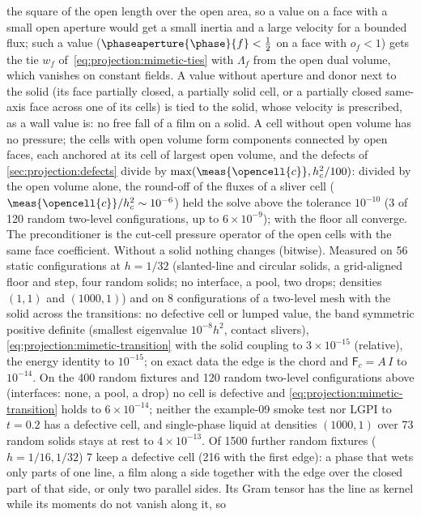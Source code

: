 the square of the open length over the open area, so a value on a face with a
small open aperture would get a small inertia and a large velocity for a
bounded flux; such a value ($\phaseaperture{\phase}{f}<\frac12$ on a face with
$o_f<1$) gets the tie $w_f$ of~\cref{eq:projection:mimetic-ties} with
$\Lambda_f$ from the open dual volume, which vanishes on constant fields. A value without aperture and donor
next to the solid (its face partially closed, a partially solid cell, or a
partially closed same-axis face across one of its cells) is tied to the
solid, whose velocity is prescribed, as a wall value is: no free fall of a
film on a solid. A cell without open volume has no pressure; the cells with
open volume form components connected by open faces, each anchored at its
cell of largest open volume, and the defects of
\cref{sec:projection:defects} divide by $\max(\meas{\opencell{c}},h_c^2/100)$:
divided by the open volume alone, the round-off of the fluxes of a sliver
cell ($\meas{\opencell{c}}/h_c^2\sim10^{-6}$) held the solve above the
tolerance $10^{-10}$ (3 of 120 random two-level configurations, up to
$6\times10^{-9}$); with the floor all converge. The
preconditioner is the cut-cell pressure operator of the open cells with the
same face coefficient. Without a solid nothing changes (bitwise).
Measured on 56 static configurations at $h=1/32$ (slanted-line and circular
solids, a grid-aligned floor and step, four random solids; no interface, a
pool, two drops; densities $(1,1)$ and $(1000,1)$) and on 8 configurations
of a two-level mesh with the solid across the transitions: no defective cell
or lumped value, the band symmetric positive definite (smallest eigenvalue
$10^{-8}h^2$, contact slivers), \cref{eq:projection:mimetic-transition} with
the solid coupling to $3\times10^{-15}$ (relative), the energy identity to
$10^{-15}$; on exact data the edge is the chord and
$\mathsf F_c=A\,I$ to $10^{-14}$. On the 400 random fixtures and 120 random
two-level configurations above (interfaces: none, a pool, a drop) no cell is
defective and \cref{eq:projection:mimetic-transition} holds to
$6\times10^{-14}$; neither the example-09 smoke test nor LGPI to $t=0.2$ has a
defective cell, and single-phase liquid at densities $(1000,1)$ over 73 random
solids stays at rest to $4\times10^{-13}$. Of 1500 further random fixtures
($h=1/16,1/32$) 7 keep a defective cell (216 with the first edge): a phase
that wets only parts of one line, a film along a side together with the edge
over the closed part of that side, or only two parallel sides. Its Gram
tensor has the line as kernel while its moments do not vanish along it, so
